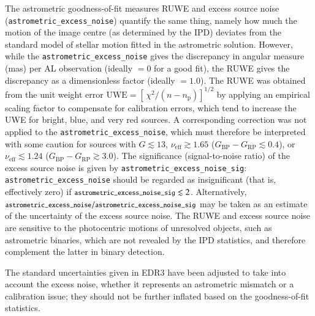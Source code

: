 \documentclass[longauth]{aa} %
\newcommand{\gacs}[1]{{\footnotesize\texttt{#1}}}
\begin{document}
The astrometric goodness-of-fit measures RUWE and excess source noise 
(\gacs{astrometric\_excess\_noise}) quantify the same thing, namely how much 
the motion of the image centre (as determined by the IPD) deviates from 
the standard model of stellar motion fitted in the astrometric solution. However, while
the \gacs{astrometric\_excess\_noise} gives the discrepancy in angular measure (mas) 
per AL observation (ideally $=0$ for a good fit), the RUWE gives the discrepancy as a 
dimensionless factor (ideally $=1.0$). The RUWE was obtained from the unit weight 
error $\text{UWE}=[\,\chi^2/(n-n_\text{p})]^{1/2}$ by applying an empirical scaling 
factor to compensate for calibration errors, which tend to increase the UWE for bright, 
blue, and very red sources. A corresponding correction was not applied to the 
\gacs{astrometric\_excess\_noise}, which must therefore be interpreted with 
some caution for sources with $G\lesssim 13$, $\nu_\text{eff}\gtrsim 1.65$ 
($G_\text{BP}{-}G_\text{RP}\lesssim 0.4$), or $\nu_\text{eff}\lesssim 1.24$ 
($G_\text{BP}{-}G_\text{RP}\gtrsim 3.0$). The significance (signal-to-noise ratio) 
of the excess source noise is given by \gacs{astrometric\_excess\_noise\_sig}: 
\gacs{astrometric\_excess\_noise} should be regarded as insignificant (that is, 
effectively zero) if $\gacs{astrometric\_excess\_noise\_sig}\lesssim 2$. Alternatively, 
$\gacs{astrometric\_excess\_noise}/\gacs{astrometric\_excess\_noise\_sig}$ may
be taken as an estimate of the uncertainty of the excess source noise.
The RUWE and excess source noise are sensitive to the photocentric motions of 
unresolved objects, such as astrometric binaries, which are not revealed by the
IPD statistics, and therefore complement the latter in binary detection.

The standard uncertainties given in EDR3 have been adjusted to take into account 
the excess noise, whether it represents an astrometric mismatch or a calibration 
issue; they should not be further inflated based on the goodness-of-fit 
statistics.
\end{document}
